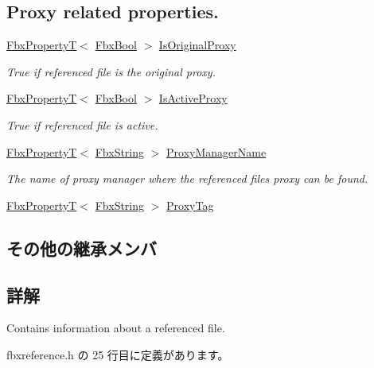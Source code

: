 \subsection*{Proxy related properties.}
\begin{DoxyCompactItemize}
\item 
\hyperlink{class_fbx_property_t}{Fbx\+PropertyT}$<$ \hyperlink{fbxtypes_8h_a92e0562b2fe33e76a242f498b362262e}{Fbx\+Bool} $>$ \hyperlink{class_fbx_scene_reference_a5bf9c05304a408f9436a0677c3b4acef}{Is\+Original\+Proxy}
\begin{DoxyCompactList}\small\item\em {\ttfamily True} if referenced file is the original proxy. \end{DoxyCompactList}\item 
\hyperlink{class_fbx_property_t}{Fbx\+PropertyT}$<$ \hyperlink{fbxtypes_8h_a92e0562b2fe33e76a242f498b362262e}{Fbx\+Bool} $>$ \hyperlink{class_fbx_scene_reference_aab3571ac4fd553d5f3fbb3710c39adac}{Is\+Active\+Proxy}
\begin{DoxyCompactList}\small\item\em {\ttfamily True} if referenced file is active. \end{DoxyCompactList}\item 
\hyperlink{class_fbx_property_t}{Fbx\+PropertyT}$<$ \hyperlink{class_fbx_string}{Fbx\+String} $>$ \hyperlink{class_fbx_scene_reference_aac92c29ead8f25eea0dbaf0649b49c96}{Proxy\+Manager\+Name}
\begin{DoxyCompactList}\small\item\em The name of proxy manager where the referenced file\textquotesingle{}s proxy can be found. \end{DoxyCompactList}\item 
\hyperlink{class_fbx_property_t}{Fbx\+PropertyT}$<$ \hyperlink{class_fbx_string}{Fbx\+String} $>$ \hyperlink{class_fbx_scene_reference_a0ced8e6b90ec7d085b82c194188d89bb}{Proxy\+Tag}
\end{DoxyCompactItemize}
\subsection*{その他の継承メンバ}


\subsection{詳解}
Contains information about a referenced file. 

 fbxreference.\+h の 25 行目に定義があります。



